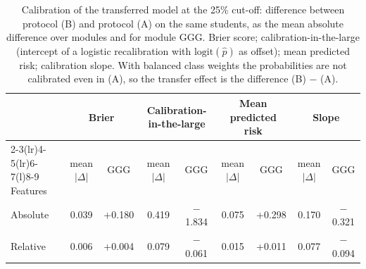 \begin{table}[t]
\centering
\caption{Calibration of the transferred model at the 25\% cut-off: difference between protocol (B) and protocol (A) on the same students, as the mean absolute difference over modules and for module GGG. Brier score; calibration-in-the-large (intercept of a logistic recalibration with $\mathrm{logit}(\hat{p})$ as offset); mean predicted risk; calibration slope. With balanced class weights the probabilities are not calibrated even in (A), so the transfer effect is the difference (B) $-$ (A).}
\label{tab:calibration}
\footnotesize
\begin{tabular}{@{}lcccccccc@{}}
\toprule
 & \multicolumn{2}{c}{Brier} & \multicolumn{2}{c}{Calibration-in-the-large} & \multicolumn{2}{c}{Mean predicted risk} & \multicolumn{2}{c}{Slope} \\
\cmidrule(lr){2-3}\cmidrule(lr){4-5}\cmidrule(lr){6-7}\cmidrule(l){8-9}
Features & mean $|\Delta|$ & GGG & mean $|\Delta|$ & GGG & mean $|\Delta|$ & GGG & mean $|\Delta|$ & GGG \\
\midrule
Absolute & 0.039 & +0.180 & 0.419 & $-$1.834 & 0.075 & +0.298 & 0.170 & $-$0.321 \\
Relative & 0.006 & +0.004 & 0.079 & $-$0.061 & 0.015 & +0.011 & 0.077 & $-$0.094 \\
\bottomrule
\end{tabular}
\end{table}
